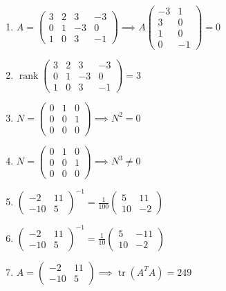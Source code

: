 \documentclass[11pt,a4paper]{article}
\begin{document}
\begin{enumerate}
\item $\displaystyle A = \begin{pmatrix} 3 & 2 & 3 & -3 \\ 0 & 1 & -3 & 0 \\ 1 & 0 & 3 & -1 \end{pmatrix} \implies A \begin{pmatrix} -3 & 1 \\ 3 & 0 \\ 1 & 0 \\ 0 & -1 \end{pmatrix} = 0$
\item $\displaystyle \operatorname{rank} \begin{pmatrix} 3 & 2 & 3 & -3 \\ 0 & 1 & -3 & 0 \\ 1 & 0 & 3 & -1 \end{pmatrix} = 3$
\item $\displaystyle N = \begin{pmatrix} 0 & 1 & 0 \\ 0 & 0 & 1 \\ 0 & 0 & 0 \end{pmatrix} \implies N^{2} = 0$
\item $\displaystyle N = \begin{pmatrix} 0 & 1 & 0 \\ 0 & 0 & 1 \\ 0 & 0 & 0 \end{pmatrix} \implies N^{3} \neq 0$
\item $\displaystyle \begin{pmatrix} -2 & 11 \\ -10 & 5 \end{pmatrix}^{-1} = \frac{1}{100} \begin{pmatrix} 5 & 11 \\ 10 & -2 \end{pmatrix}$
\item $\displaystyle \begin{pmatrix} -2 & 11 \\ -10 & 5 \end{pmatrix}^{-1} = \frac{1}{10} \begin{pmatrix} 5 & -11 \\ 10 & -2 \end{pmatrix}$
\item $\displaystyle A = \begin{pmatrix} -2 & 11 \\ -10 & 5 \end{pmatrix} \implies \operatorname{tr}\left( A^{T} A \right) = 249$

\end{enumerate}
\end{document}
